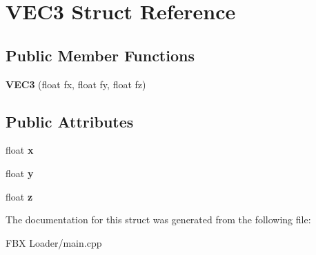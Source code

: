 \hypertarget{struct_v_e_c3}{}\section{V\+E\+C3 Struct Reference}
\label{struct_v_e_c3}
\subsection*{Public Member Functions}
\begin{DoxyCompactItemize}
\item 
{\bfseries V\+E\+C3} (float fx, float fy, float fz)\hypertarget{struct_v_e_c3_aea3c53fb944a42b885b7751ff6292063}{}\label{struct_v_e_c3_aea3c53fb944a42b885b7751ff6292063}

\end{DoxyCompactItemize}
\subsection*{Public Attributes}
\begin{DoxyCompactItemize}
\item 
float {\bfseries x}\hypertarget{struct_v_e_c3_a86cad4f096391f6d6e205f4d9813791e}{}\label{struct_v_e_c3_a86cad4f096391f6d6e205f4d9813791e}

\item 
float {\bfseries y}\hypertarget{struct_v_e_c3_a6ec6e56cfd55e198ef104bd7102fad33}{}\label{struct_v_e_c3_a6ec6e56cfd55e198ef104bd7102fad33}

\item 
float {\bfseries z}\hypertarget{struct_v_e_c3_a9a354ce65ea7e3783f6c16a2ecc14f49}{}\label{struct_v_e_c3_a9a354ce65ea7e3783f6c16a2ecc14f49}

\end{DoxyCompactItemize}


The documentation for this struct was generated from the following file\+:\begin{DoxyCompactItemize}
\item 
F\+B\+X Loader/main.\+cpp\end{DoxyCompactItemize}
